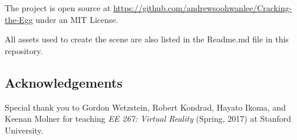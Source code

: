 \documentclass[10pt,twocolumn,letterpaper]{article}
\begin{document}
The project is open source at \url{https://github.com/andrewsoohwanlee/Cracking-the-Egg} under an MIT License.

All assets used to create the scene are also listed in the Readme.md file in this repository.

\subsection{Acknowledgements}

Special thank you to Gordon Wetzstein, Robert Kondrad, Hayato Ikoma, and Keenan Molner for teaching \textit{EE 267: Virtual Reality} (Spring, 2017) at Stanford University.

{\small


}
\end{document}
